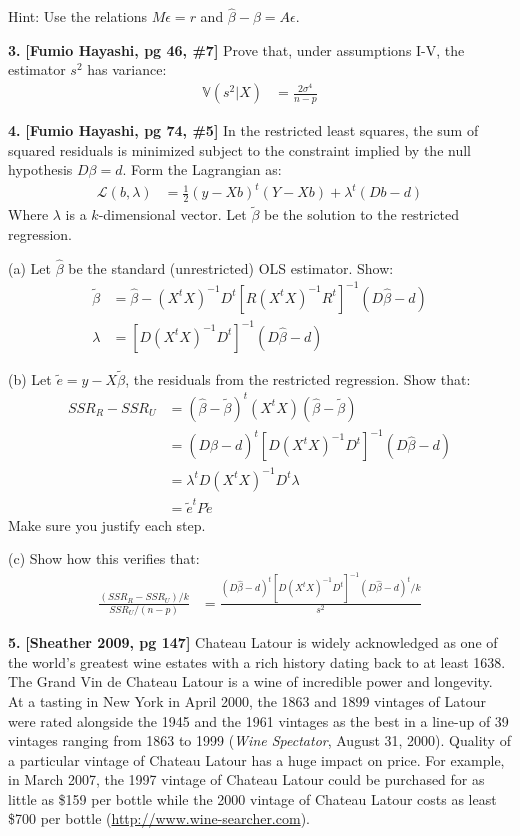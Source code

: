 \documentclass[12pt]{article}
\begin{document}
Hint: Use the relations $M\epsilon = r$ and $\widehat{\beta} - \beta = A\epsilon$.

{\bf 3.} {\bf [Fumio Hayashi, pg 46, \#7]} Prove that, under assumptions I-V, the
estimator $s^2$ has variance:
\begin{align}
\mathbb{V} (s^2 | X) &= \frac{2 \sigma^4}{n - p}
\end{align}

{\bf 4.} {\bf [Fumio Hayashi, pg 74, \#5]} In the restricted least squares, the sum of squared residuals is minimized subject to the constraint implied by the null hypothesis $D\beta = d$. Form the Lagrangian as:
\begin{align}
\mathcal{L}(b, \lambda) &= \frac{1}{2} ( y - Xb )^t ( Y - X b) + \lambda^t (D b - d)
\end{align}
Where $\lambda$ is a $k$-dimensional vector. Let $\widetilde{\beta}$ be the solution to the restricted regression.

(a) Let $\widehat{\beta}$ be the standard (unrestricted) OLS estimator. Show:
\begin{align}
\widetilde{\beta}
&= \widehat{\beta} - (X^t X)^{-1} D^t \left[R (X^t X)^{-1} R^t\right]^{-1} (D \widehat{\beta} - d) \\
\lambda &= \left[ D (X^t X)^{-1} D^t \right]^{-1} (D\widehat{\beta} - d)
\end{align}

(b) Let $\widetilde{e} = y - X\widetilde{\beta}$, the residuals from the restricted regression.
Show that:
\begin{align}
SSR_R - SSR_U &= (\widehat{\beta} - \widetilde{\beta})^t (X^t X) (\widehat{\beta} - \widetilde{\beta}) \\
&= (D \widehat{\beta} - d)^t \left[ D (X^t X)^{-1} D^t \right]^{-1} (D \widehat{\beta} - d) \\
&= \lambda^t D (X^t X)^{-1} D^t \lambda \\
&= \widetilde{e}^t P \widetilde{e}
\end{align}
Make sure you justify each step.

(c) Show how this verifies that:
\begin{align}
\frac{(SSR_R - SSR_U) / k}{SSR_U / (n - p)} &=
\frac{(D \widehat{\beta} - d)^t  [ D (X^t X)^{-1} D^t ]^{-1} (D \widehat{\beta} - d)^t / k}{s^2}
\end{align}


{\bf 5.} {\bf [Sheather 2009, pg 147]} Chateau Latour is widely acknowledged as one of the world’s greatest wine estates with a rich history dating back to at least 1638. The Grand Vin de Chateau Latour is a wine of incredible power and longevity. At a tasting in New York in April 2000, the 1863 and 1899 vintages of Latour were rated alongside the 1945 and the 1961 vintages as the best in a line-up of 39 vintages ranging from 1863 to 1999 ({\it Wine Spectator}, August 31, 2000). Quality of a particular vintage of Chateau Latour has a huge impact on price. For example, in March 2007, the 1997 vintage of Chateau Latour could be purchased for as little as \$159 per bottle while the 2000 vintage of Chateau Latour costs as least \$700 per bottle (\url{http://www.wine-searcher.com}).
\end{document}

